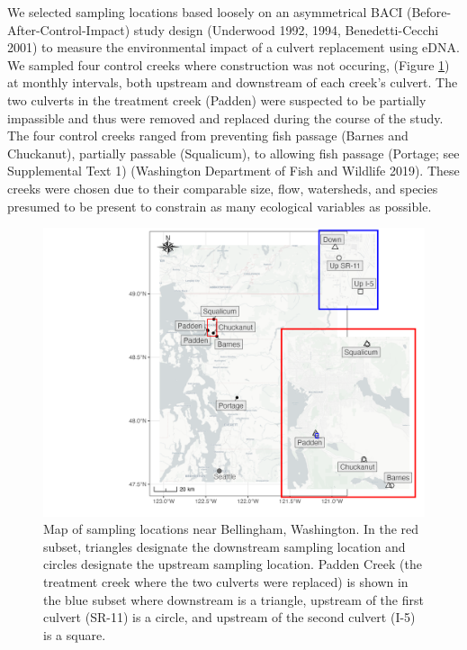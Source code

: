 \documentclass[
]{article}
\begin{document}
We selected sampling locations based loosely on an asymmetrical BACI
(Before-After-Control-Impact) study design (Underwood 1992, 1994,
Benedetti-Cecchi 2001) to measure the environmental impact of a culvert
replacement using eDNA. We sampled four control creeks where
construction was not occuring, (Figure \ref{fig:map}) at monthly
intervals, both upstream and downstream of each creek's culvert. The two
culverts in the treatment creek (Padden) were suspected to be partially
impassible and thus were removed and replaced during the course of the
study. The four control creeks ranged from preventing fish passage
(Barnes and Chuckanut), partially passable (Squalicum), to allowing fish
passage (Portage; see Supplemental Text 1) (Washington Department of
Fish and Wildlife 2019). These creeks were chosen due to their
comparable size, flow, watersheds, and species presumed to be present to
constrain as many ecological variables as possible.

\begin{figure}
\centering
\includegraphics{../Output/Figures/SiteMap.png}
\caption{Map of sampling locations near Bellingham, Washington. In the
red subset, triangles designate the downstream sampling location and
circles designate the upstream sampling location. Padden Creek (the
treatment creek where the two culverts were replaced) is shown in the
blue subset where downstream is a triangle, upstream of the first
culvert (SR-11) is a circle, and upstream of the second culvert (I-5) is
a square.\label{fig:map}}
\end{figure}
\end{document}

